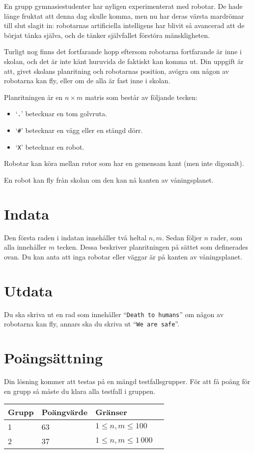 
En grupp gymnasiestudenter har nyligen experimenterat med robotar. De hade
länge fruktat att denna dag skulle komma, men nu har deras värsta
mardrömar till slut slagit in: robotarnas artificiella intelligens har blivit
så avancerad att de börjat tänka själva, och de tänker självfallet förstöra
mänskligheten.

Turligt nog finns det fortfarande hopp eftersom robotarna fortfarande är inne
i skolan, och det är inte känt huruvida de faktiskt kan komma ut.
Din uppgift är att, givet skolans planritning och robotarnas position, avögra
om någon av robotarna kan fly, eller om de alla är fast inne i skolan.

Planritningen är en $n \times m$ matris som består av följande tecken:

\begin{itemize}
    \item `\texttt{.}' betecknar en tom golvruta.
    \item `\texttt{\#}' betecknar en vägg eller en stängd dörr. 
    \item `\texttt{X}' betecknar en robot.
\end{itemize}

Robotar kan köra mellan rutor som har en gemensam kant (men inte digonalt).

En robot kan fly från skolan om den kan nå kanten av våningsplanet.

\section*{Indata}
Den första raden i indatan innehåller två heltal $n, m$. Sedan
följer $n$ rader, som alla innehåller $m$ tecken. Dessa beskriver planritningen
på sättet som definerades ovan. Du kan anta att inga robotar eller väggar är på
kanten av våningsplanet.

\section*{Utdata}
Du ska skriva ut en rad som innehåller ``\texttt{Death to humans}'' om någon av robotarna kan
fly, annars ska du skriva ut ``\texttt{We are safe}''.

\section*{Poängsättning}
Din lösning kommer att testas på en mängd testfallsgrupper. För att få poäng
för en grupp så måste du klara alla testfall i gruppen.

\begin{tabular}{| l | l | l | l |}
    \hline
    Grupp & Poängvärde & Gränser    \\ \hline
    1     & 63         & $1 \le n, m \le 100$ \\ \hline
    2     & 37         & $1 \le n, m \le 1\,000$ \\ \hline
\end{tabular}

